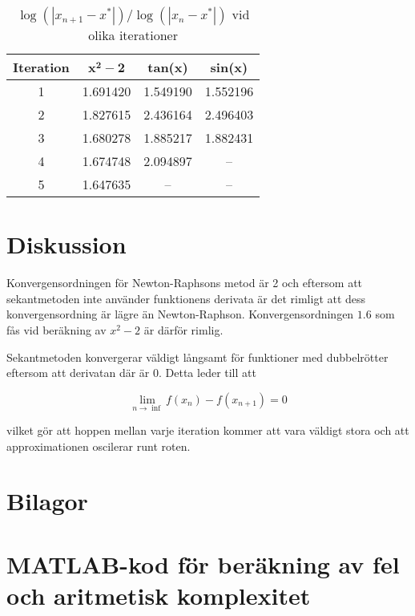 \documentclass[a4paper,titlepage]{article}
\begin{document}
\begin{table}[h]
    \centering
    \label{tab:ps}
    \begin{tabular}{c | c | c | c}
        \textbf{Iteration} & $\mathbf{x^2 - 2}$ & \textbf{tan(x)} & \textbf{sin(x)} \\ \hline
        1 & 1.691420 & 1.549190 & 1.552196 \\
        2 & 1.827615 & 2.436164 & 2.496403 \\
        3 & 1.680278 & 1.885217 & 1.882431 \\
        4 & 1.674748 & 2.094897 & -- \\
        5 & 1.647635 & --       & -- \\
        
    \end{tabular}
    \caption{$\log(|x_{n + 1} - x^*|)/\log(|x_n - x^*|)$ vid olika iterationer}
\end{table}

\section{Diskussion}

Konvergensordningen för Newton-Raphsons metod är 2 och eftersom att sekantmetoden
inte använder funktionens derivata är det rimligt att dess konvergensordning är lägre
än Newton-Raphson. Konvergensordningen $1.6$ som fås vid beräkning av $x^2-2$ är
därför rimlig.

Sekantmetoden konvergerar väldigt långsamt för funktioner med dubbelrötter eftersom
att derivatan där är 0. Detta leder till att

\[
    \lim_{n \to \inf} f(x_n) - f(x_{n+1}) = 0
\]

vilket gör att hoppen mellan varje iteration kommer att vara väldigt stora och att
approximationen oscilerar runt roten.

\section*{Bilagor}
\appendix

\section{MATLAB-kod för beräkning av fel och aritmetisk komplexitet}
\label{sec:testcode}
\end{document}
